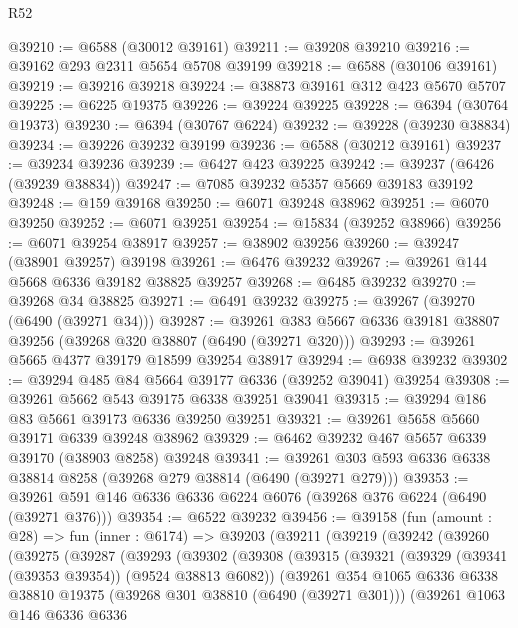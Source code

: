 \begin{lexlean}{R52}
\begin{coremodule}
@39210 := @6588 (@30012 @39161)
@39211 := @39208 @39210
@39216 := @39162 @293 @2311 @5654 @5708 @39199
@39218 := @6588 (@30106 @39161)
@39219 := @39216 @39218
@39224 := @38873 @39161 @312 @423 @5670 @5707
@39225 := @6225 @19375
@39226 := @39224 @39225
@39228 := @6394 (@30764 @19373)
@39230 := @6394 (@30767 @6224)
@39232 := @39228 (@39230 @38834)
@39234 := @39226 @39232 @39199
@39236 := @6588 (@30212 @39161)
@39237 := @39234 @39236
@39239 := @6427 @423 @39225
@39242 := @39237 (@6426 (@39239 @38834))
@39247 := @7085 @39232 @5357 @5669 @39183 @39192
@39248 := @159 @39168
@39250 := @6071 @39248 @38962
@39251 := @6070 @39250
@39252 := @6071 @39251
@39254 := @15834 (@39252 @38966)
@39256 := @6071 @39254 @38917
@39257 := @38902 @39256
@39260 := @39247 (@38901 @39257) @39198
@39261 := @6476 @39232
@39267 := @39261 @144 @5668 @6336 @39182 @38825 @39257
@39268 := @6485 @39232
@39270 := @39268 @34 @38825
@39271 := @6491 @39232
@39275 := @39267 (@39270 (@6490 (@39271 @34)))
@39287 := @39261 @383 @5667 @6336 @39181 @38807 @39256 (@39268 @320 @38807 (@6490 (@39271 @320)))
@39293 := @39261 @5665 @4377 @39179 @18599 @39254 @38917
@39294 := @6938 @39232
@39302 := @39294 @485 @84 @5664 @39177 @6336 (@39252 @39041) @39254
@39308 := @39261 @5662 @543 @39175 @6338 @39251 @39041
@39315 := @39294 @186 @83 @5661 @39173 @6336 @39250 @39251
@39321 := @39261 @5658 @5660 @39171 @6339 @39248 @38962
@39329 := @6462 @39232 @467 @5657 @6339 @39170 (@38903 @8258) @39248
@39341 := @39261 @303 @593 @6336 @6338 @38814 @8258 (@39268 @279 @38814 (@6490 (@39271 @279)))
@39353 := @39261 @591 @146 @6336 @6336 @6224 @6076 (@39268 @376 @6224 (@6490 (@39271 @376)))
@39354 := @6522 @39232
@39456 := @39158
    (fun (amount : @28) =>
    fun (inner : @6174) =>
    @39203
      (@39211
        (@39219
          (@39242
            (@39260
              (@39275
                (@39287
                  (@39293
                    (@39302
                      (@39308
                        (@39315
                          (@39321
                            (@39329 (@39341 (@39353 @39354)) (@9524 @38813 @6082))
                            (@39261
                              @354
                              @1065
                              @6336
                              @6338
                              @38810
                              @19375
                              (@39268 @301 @38810 (@6490 (@39271 @301)))
                              (@39261
                                @1063
                                @146
                                @6336
                                @6336

\end{coremodule}
\end{lexlean}
